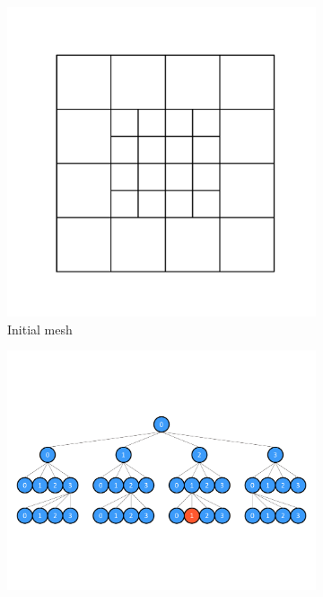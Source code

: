 \begin{figure}[t]
    \centering
    \begin{subfigure}[t]{0.35\textwidth}
        \includegraphics[width=0.95\linewidth, clip=true, trim={0 150 0 150}]{figures/adaptive-mesh-00.pdf}
        \caption{Initial mesh}
        \label{fig:adaptive-mesh-rebuild-00}
    \end{subfigure}
    \begin{subfigure}[t]{0.55\textwidth}
        \includegraphics[width=0.95\linewidth, clip=true, trim={0 150 0 150}]{figures/adaptive-tree-rebuild-00.pdf}

\end{subfigure}
\end{figure}
